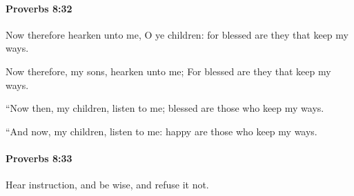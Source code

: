 		\paragraph{Proverbs 8:32} %
			\label{PROVERBS-8-32}

			Now therefore hearken unto me, O ye children: for blessed are they that keep my ways.

			\begin{versebox}
					\item[BHS] 
					\item[ASV] Now therefore, my sons, hearken unto me; For blessed are they that keep my ways.
					\item[NIV] “Now then, my children, listen to me; blessed are those who keep my ways.
					\item[NRSV] “And now, my children, listen to me: happy are those who keep my ways.
			\end{versebox}

		\paragraph{Proverbs 8:33} %
			\label{PROVERBS-8-33}

			Hear instruction, and be wise, and refuse it not.

